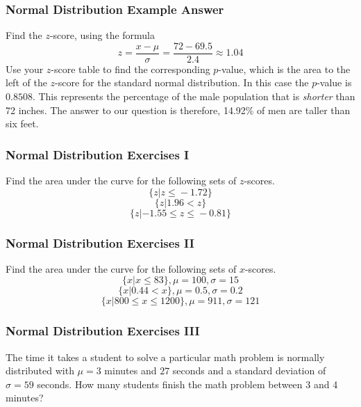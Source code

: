 \documentclass[xcolor=dvipsnames]{beamer}
\begin{document}
\begin{frame}
  \frametitle{Normal Distribution Example Answer}
  Find the $z$-score, using the formula
  \begin{equation}
    \label{eq:igutheib}
    z=\frac{x-\mu}{\sigma}=\frac{72-69.5}{2.4}\approx{}1.04
  \end{equation}
  Use your $z$-score table to find the corresponding
  \alert{$p$-value}, which is the area to the left of the $z$-score
  for the standard normal distribution. In this case the $p$-value is
  $0.8508$. This represents the percentage of the male population that
  is \emph{shorter} than 72 inches. The answer to our question is
  therefore, 14.92\% of men are taller than six feet.
\end{frame}

\begin{frame}
  \frametitle{Normal Distribution Exercises I}
{\ubung} Find the area under the curve for the following sets of
$z$-scores. 
\begin{equation}
  \label{eq:deapheph}
\{z|z\leq{}-1.72\}  
\end{equation}
\begin{equation}
  \label{eq:taedaiga}
\{z|1.96<{}z\}  
\end{equation}
\begin{equation}
  \label{eq:ahraefis}
\{z|-1.55\leq{}z\leq{}-0.81\}
\end{equation}
\end{frame}

\begin{frame}
  \frametitle{Normal Distribution Exercises II}
{\ubung} Find the area under the curve for the
following sets of $x$-scores. 
\begin{equation}
  \label{eq:aequaixe}
\{x|x\leq{}83\},\mu=100,\sigma=15
\end{equation}
\begin{equation}
  \label{eq:oocohdau}
\{x|0.44<x\},\mu=0.5,\sigma=0.2  
\end{equation}
\begin{equation}
  \label{eq:aethohph}
\{x|800\leq{}x\leq{}1200\},\mu=911,\sigma=121
\end{equation}
\end{frame}

\begin{frame}
  \frametitle{Normal Distribution Exercises III}
{\ubung} The time it takes a student to solve a particular math problem is
normally distributed with $\mu=3$ minutes and $27$ seconds and a
standard deviation of $\sigma=59$ seconds. How many students finish
the math problem between 3 and 4 minutes?
\end{frame}
\end{document}
